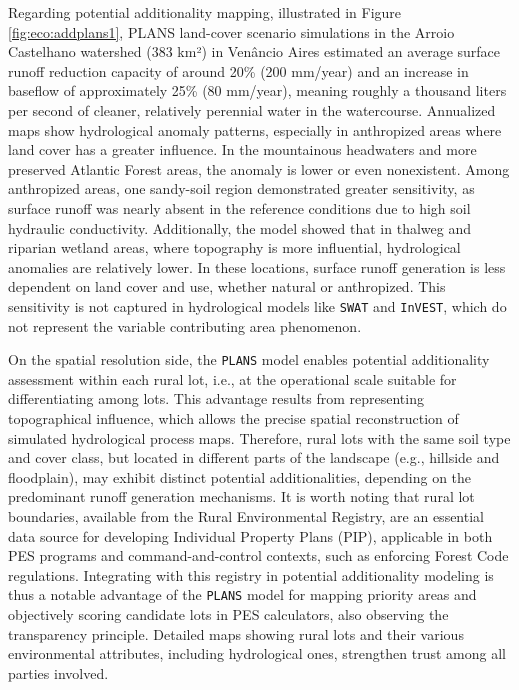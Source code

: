 \documentclass[./main_en.tex]{subfiles}
\begin{document}
Regarding potential additionality mapping, illustrated in Figure \ref{fig:eco:addplans1}, PLANS land-cover scenario simulations in the Arroio Castelhano watershed (383 km²) in Venâncio Aires estimated an average surface runoff reduction capacity of around 20\% (200 mm/year) and an increase in baseflow of approximately 25\% (80 mm/year), meaning roughly a thousand liters per second of cleaner, relatively perennial water in the watercourse. Annualized maps show hydrological anomaly patterns, especially in anthropized areas where land cover has a greater influence. In the mountainous headwaters and more preserved Atlantic Forest areas, the anomaly is lower or even nonexistent. Among anthropized areas, one sandy-soil region demonstrated greater sensitivity, as surface runoff was nearly absent in the reference conditions due to high soil hydraulic conductivity. Additionally, the model showed that in thalweg and riparian wetland areas, where topography is more influential, hydrological anomalies are relatively lower. In these locations, surface runoff generation is less dependent on land cover and use, whether natural or anthropized. This sensitivity is not captured in hydrological models like \texttt{SWAT} and \texttt{InVEST}, which do not represent the variable contributing area phenomenon.

On the spatial resolution side, the \texttt{PLANS} model enables potential additionality assessment within each rural lot, i.e., at the operational scale suitable for differentiating among lots. This advantage results from representing topographical influence, which allows the precise spatial reconstruction of simulated hydrological process maps. Therefore, rural lots with the same soil type and cover class, but located in different parts of the landscape (e.g., hillside and floodplain), may exhibit distinct potential additionalities, depending on the predominant runoff generation mechanisms. It is worth noting that rural lot boundaries, available from the Rural Environmental Registry, are an essential data source for developing Individual Property Plans (PIP), applicable in both PES programs and command-and-control contexts, such as enforcing Forest Code regulations. Integrating with this registry in potential additionality modeling is thus a notable advantage of the \texttt{PLANS} model for mapping priority areas and objectively scoring candidate lots in PES calculators, also observing the transparency principle. Detailed maps showing rural lots and their various environmental attributes, including hydrological ones, strengthen trust among all parties involved.
\end{document}
